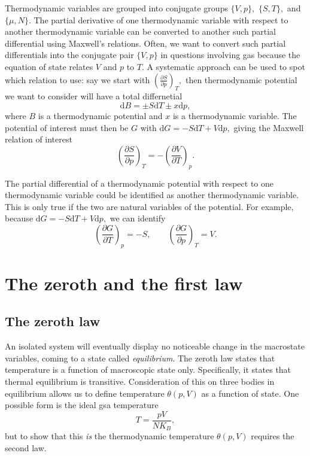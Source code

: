 \documentclass{article}
\theoremstyle{nonumberplain}
\begin{document}
Thermodynamic variables are grouped into conjugate groups $\{V,p\},$ $\{S,T\},$ and $\{\mu ,N\}.$ The partial derivative of one thermodynamic variable with respect to another thermodynamic variable can be converted to another such partial differential using Maxwell's relations. Often, we want to convert such partial differentials into the conjugate pair $\{V,p\}$ in questions involving gas because the equation of state relates $V$ and $p$ to $T.$ A systematic approach can be used to spot which relation to use: say we start with 
\(
    \left( \frac{\partial S}{\partial p} \right)_{T}, 
\)
then thermodynamic potential we want to consider will have a total differnetial
\[
    \mathrm{d} B = \pm S \mathrm{d} T \pm x \mathrm{d} p, 
\]
where $B$ is a thermodynamic potential and $x$ is a thermodynamic variable. The potential of interest must then be $G$ with $\mathrm{d} G = -S\mathrm{d} T + V \mathrm{d} p,$ giving the Maxwell relation of interest
\[
    \left( \frac{\partial S}{\partial p} \right)_{T} = 
    -\left( \frac{\partial V}{\partial T} \right)_{p}. 
\]

The partial differential of a thermodynamic potential with respect to one thermodynamic variable could be identified as another thermodynamic variable. This is only true if the two are natural variables of the potential. For example, because \(\mathrm{d} G = -S\mathrm{d} T + V \mathrm{d} p,\) we can identify
\[
    \left( \frac{\partial G}{\partial T} \right)_{p} = -S, 
    \qquad
    \left( \frac{\partial G}{\partial p} \right)_{T} = V.
\]
\section{The zeroth and the first law}
\subsection{The zeroth law}
An isolated system will eventually display no noticeable change in the macrostate variables, coming to a state called \textit{equilibrium}. The zeroth law states that temperature is a function of macroscopic state only. Specifically, it states that thermal equilibrium is transitive. Consideration of this on three bodies in equilibrium allows us to define temperature $\theta(p,V)$ as a function of state. One possible form is the ideal gsa temperature 
\[
    T = \frac{p V}{N K_B}, 
\]
but to show that this \textit{is} the thermodynamic temperature $\theta(p,V)$ requires the second law. 
\end{document}
